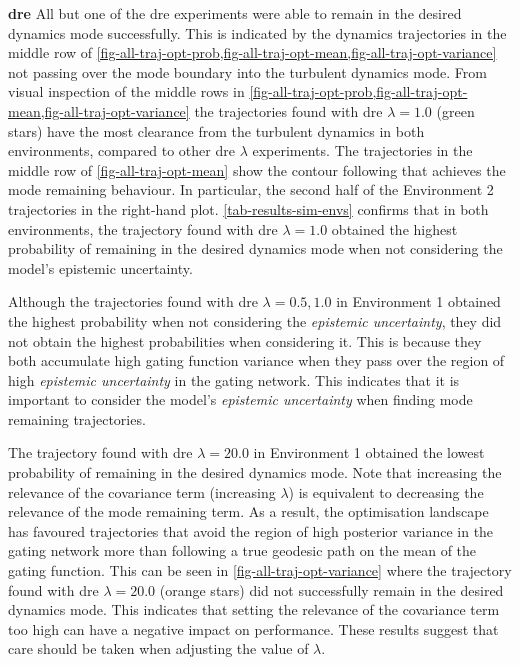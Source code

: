 \documentclass{mimosis-class/mimosis}
\numberwithin{equation}{chapter}
\begin{document}
{\newline
\textbf{\acrfull{dre}}
All but one of the \acrshort{dre} experiments were able to remain in the desired dynamics mode successfully.
This is indicated by the dynamics trajectories in the middle row of
\cref{fig-all-traj-opt-prob,fig-all-traj-opt-mean,fig-all-traj-opt-variance}
not passing over the mode boundary into the turbulent dynamics mode.
From visual inspection of the middle rows in
\cref{fig-all-traj-opt-prob,fig-all-traj-opt-mean,fig-all-traj-opt-variance}
the trajectories found with \acrshort{dre} \(\lambda=1.0\) (green stars) have the most clearance from the turbulent dynamics
in both environments, compared to other \acrshort{dre} \(\lambda\) experiments.
The trajectories in the middle row of \cref{fig-all-traj-opt-mean}
show the contour following that achieves the mode remaining behaviour.
In particular, the second half of the Environment 2 trajectories in the right-hand plot.
\cref{tab-results-sim-envs} confirms that in both environments, the trajectory found with \acrshort{dre} \(\lambda=1.0\) obtained
the highest probability of remaining in the desired dynamics mode when not considering the model's
epistemic uncertainty.


Although the trajectories found with \acrshort{dre} \(\lambda=0.5, 1.0\) in Environment 1
obtained the highest probability when not considering the \emph{epistemic uncertainty},
they did not obtain the highest probabilities when considering it.
This is because they both accumulate high gating function variance when they pass over the region of high \emph{epistemic
uncertainty} in the gating network.
This indicates that it is important to consider the model's \emph{epistemic uncertainty} when finding
mode remaining trajectories.

The trajectory found with \acrshort{dre} \(\lambda=20.0\) in Environment 1 obtained the lowest probability of
remaining in the desired dynamics mode.
Note that increasing the relevance of the covariance term (increasing \(\lambda\))
is equivalent to decreasing the relevance of the mode remaining term.
As a result, the optimisation landscape has favoured trajectories that
avoid the region of high posterior variance in the gating network more than following a true geodesic path
on the mean of the gating function.
This can be seen in \cref{fig-all-traj-opt-variance} where
the trajectory found with \acrshort{dre} \(\lambda=20.0\) (orange stars)
did not successfully remain in the desired dynamics mode.
This indicates that setting the relevance of the covariance term too high can have a negative impact on performance.
These results suggest that care should be taken when adjusting the value of \(\lambda\).

}
\end{document}
